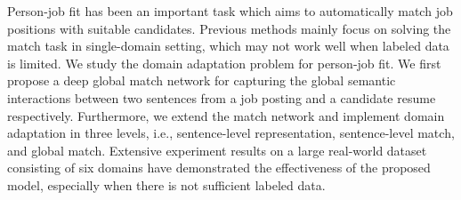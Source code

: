 Person-job fit has been an important task which aims to automatically match job positions with suitable candidates. Previous methods mainly focus on solving the match task in single-domain setting, which may not work well when labeled data is limited. We study the domain adaptation problem for person-job fit. We first propose a deep global match network for capturing the global semantic interactions between two sentences from a job posting and a candidate resume respectively. Furthermore, we extend the match network and implement domain adaptation in three levels, i.e., sentence-level representation, sentence-level match, and global match. Extensive experiment results on a large real-world dataset consisting of six domains have demonstrated the effectiveness of the proposed model, especially when there is not sufficient labeled data.
